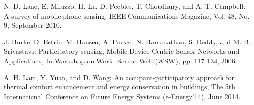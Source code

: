 \documentclass[submit,techrep]{ipsj}
\begin{document}
{\begin{thebibliography}{10}
N. D. Lane, E. Miluzzo, H. Lu, D. Peebles, T. Choudhury, and A. T. Campbell:
A survey of mobile phone sensing,
IEEE Communications Magazine, Vol. 48, No. 9,
September 2010.


J. Burke, D. Estrin, M. Hansen, A. Parker, N. Ramanathan, S. Reddy, and M. B. Srivastava:
Participatory sensing, Mobile Device Centric Sensor Networks and Applications,
In Workshop on World-Sensor-Web (WSW),
pp. 117-134, 2006.



A. H. Lam, Y. Yuan, and D. Wang:
An occupant-participatory approach for thermal comfort enhancement and energy conservation in buildings, The 5th International Conference on Future Energy Systems (e-Energy'14), June 2014.





\end{thebibliography}}
\end{document}
